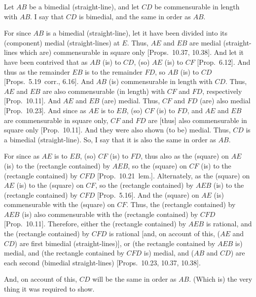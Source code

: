 \begin{Parallel}{}{}
{\epsfysize=0.7in 
\centerline{}
 
Let $AB$ be a bimedial (straight-line), and let $CD$ be commensurable
in length with $AB$. I say that $CD$ is bimedial, and the same in order as
$AB$.

For since $AB$ is a bimedial (straight-line), let it have been divided into its
(component) medial (straight-lines) at $E$. Thus, $AE$ and $EB$
are medial (straight-lines which are) commensurable in square only [Props.~10.37, 10.38]. And
let it have been contrived that as $AB$ (is) to $CD$, (so) $AE$ (is)
to $CF$ [Prop.~6.12]. And thus as the remainder $EB$ is to the remainder $FD$, so $AB$ (is) to $CD$ [Props.~5.19~corr., 6.16].
And $AB$ (is) commensurable in length with $CD$. Thus, $AE$
and $EB$ are also commensurable (in length) with $CF$ and $FD$, respectively [Prop.~10.11]. And 
$AE$ and $EB$ (are) medial. Thus, $CF$ and $FD$ (are) also
medial [Prop.~10.23]. And since as $AE$
is to $EB$, (so) $CF$ (is) to $FD$, and $AE$ and $EB$ are commensurable
in square only, $CF$ and $FD$ are [thus] also commensurable in square only
[Prop.~10.11]. And they were also shown (to be)
medial. Thus, $CD$ is a bimedial (straight-line). So, I say that it is also the same in order as $AB$.

For since as $AE$ is to $EB$, (so) $CF$ (is) to $FD$, thus also as the
(square) on $AE$ (is) to the (rectangle contained) by $AEB$, so the (square)
on $CF$ (is) to the (rectangle contained) by $CFD$ [Prop.~10.21~lem.]. Alternately, as the (square)
on $AE$ (is) to the (square) on $CF$, so the (rectangle
contained) by $AEB$ (is) to the (rectangle contained) by $CFD$ [Prop.~5.16]. And the (square) on $AE$
(is) commensurable with the (square) on $CF$. Thus, the (rectangle
contained) by $AEB$ (is) also commensurable with the (rectangle contained)
by $CFD$ [Prop.~10.11]. Therefore,  either the
(rectangle contained) by $AEB$ is rational, and  the (rectangle contained) by
$CFD$ is rational [and, on account of this, ($AE$ and $CD$) are first
bimedial (straight-lines)], or (the rectangle contained by $AEB$ is) medial,
and (the rectangle contained by $CFD$ is) medial, and ($AB$ and
$CD$) are each second (bimedial straight-lines) [Props.~10.23, 10.37, 10.38].

And, on account of this, $CD$ will be  the same in order as $AB$.
(Which is) the very thing it was required to show.}
\end{Parallel}

